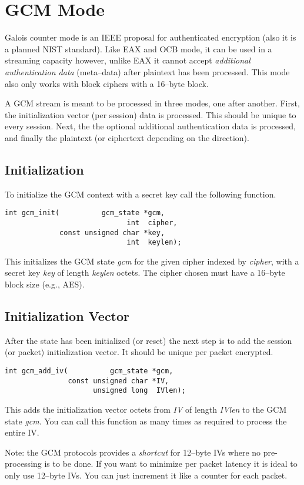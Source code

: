 \documentclass[synpaper]{book}
\newcommand{\mysection}[1]    %
	{                   %
	\section{#1}
   \markboth{\textsf{www.libtom.net}}{\thesection ~ {#1}}
	}
\begin{document}
\mysection{GCM Mode}
Galois counter mode is an IEEE proposal for authenticated encryption (also it is a planned NIST standard).  Like EAX and OCB mode, it can be used in a streaming capacity
however, unlike EAX it cannot accept \textit{additional authentication data} (meta--data) after plaintext has been processed.  This mode also only works with
block ciphers with a 16--byte block.

A GCM stream is meant to be processed in three modes, one after another.  First, the initialization vector (per session) data is processed.  This should be
unique to every session.  Next, the the optional additional authentication data is processed, and finally the plaintext (or ciphertext depending on the direction).

\subsection{Initialization}
To initialize the GCM context with a secret key call the following function.

\begin{verbatim}
int gcm_init(          gcm_state *gcm,
                             int  cipher,
             const unsigned char *key,
                             int  keylen);
\end{verbatim}
This initializes the GCM state \textit{gcm} for the given cipher indexed by \textit{cipher}, with a secret key \textit{key} of length \textit{keylen} octets.  The cipher
chosen must have a 16--byte block size (e.g., AES).

\subsection{Initialization Vector}
After the state has been initialized (or reset) the next step is to add the session (or packet) initialization vector.  It should be unique per packet encrypted.

\begin{verbatim}
int gcm_add_iv(          gcm_state *gcm,
               const unsigned char *IV,
                     unsigned long  IVlen);
\end{verbatim}
This adds the initialization vector octets from \textit{IV} of length \textit{IVlen} to the GCM state \textit{gcm}.  You can call this function as many times as required
to process the entire IV.

Note: the GCM protocols provides a \textit{shortcut} for 12--byte IVs where no pre-processing is to be done.  If you want to minimize per packet latency it is ideal
to only use 12--byte IVs.  You can just increment it like a counter for each packet.
\end{document}
